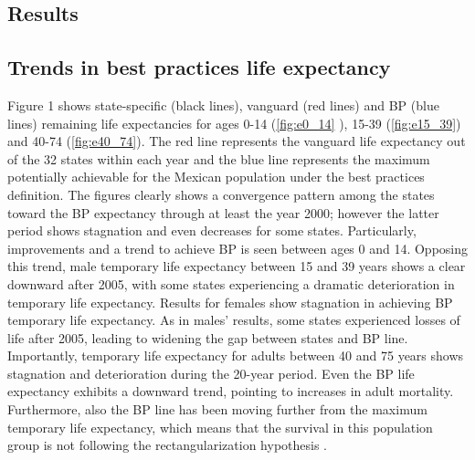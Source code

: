 \documentclass{article}
\begin{document}
\begin{spacing}{1.5}
\section*{Results}
\subsection*{Trends in best practices life expectancy}

Figure 1 shows state-specific  (black lines), vanguard  (red lines) and BP (blue lines) remaining life expectancies for ages 0-14 (\ref{fig:e0_14} ), 15-39
(\ref{fig:e15_39}) and 40-74 (\ref{fig:e40_74}). The red line represents the
vanguard life expectancy out of the 32 states within each year and the blue line
represents the maximum potentially achievable for the Mexican population under
the best practices definition.
The figures clearly shows a convergence pattern among the states toward the BP
expectancy through at least the year 2000; however the latter period shows
stagnation and even decreases for some states. Particularly, improvements and a trend to achieve BP is seen between ages 0 and 14. Opposing this trend, male temporary life expectancy between 15 and 39 years shows a clear downward after 2005, with some states experiencing a dramatic deterioration in temporary life expectancy. Results for females show stagnation in achieving BP temporary life expectancy. As in males' results, some states experienced losses of life after 2005, leading to widening the gap between states and BP line. 
Importantly, temporary life expectancy for adults between 40 and 75 years shows stagnation and deterioration during the 20-year period. Even the BP life expectancy exhibits a downward trend, pointing to increases in adult mortality. Furthermore, also the BP line has been moving further from the maximum temporary life expectancy, which means that the survival in this population group is not following the rectangularization hypothesis \citep{wilmoth1999}. 



\end{spacing}
\end{document}
